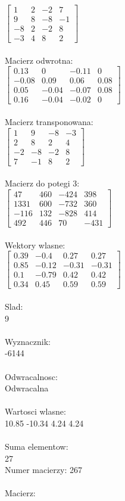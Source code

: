 \documentclass[a4paper,12pt]{article}
\begin{document}
$\begin{bmatrix} 1&2&-2&7\\9&8&-8&-1\\-8&2&-2&8\\-3&4&8&2 \end{bmatrix}$
\\
\\
Macierz odwrotna:\\

$\begin{bmatrix} 0.13&0&-0.11&0\\-0.08&0.09&0.06&0.08\\0.05&-0.04&-0.07&0.08\\0.16&-0.04&-0.02&0 \end{bmatrix}$
\\
\\
Macierz transponowana:\\

$\begin{bmatrix} 1&9&-8&-3\\2&8&2&4\\-2&-8&-2&8\\7&-1&8&2 \end{bmatrix}$
\\
\\
Macierz do potegi 3:\\

$\begin{bmatrix} 47&460&-424&398\\1331&600&-732&360\\-116&132&-828&414\\492&446&70&-431 \end{bmatrix}$
\\
\\
Wektory wlasne:\\

$\begin{bmatrix} 0.39&-0.4&0.27&0.27\\0.85&-0.12&-0.31&-0.31\\0.1&-0.79&0.42&0.42\\0.34&0.45&0.59&0.59 \end{bmatrix}$
\\
\\
Slad:\\
9
\\
\\
Wyznacznik:\\
-6144
\\
\\
Odwracalnosc:\\
Odwracalna
\\
\\
Wartosci wlasne:\\
10.85 -10.34 4.24 4.24
\\
\\
Suma elementow:\\
27
\\
\newpage
Numer macierzy:
267
\\
\\
Macierz:\\
\end{document}
